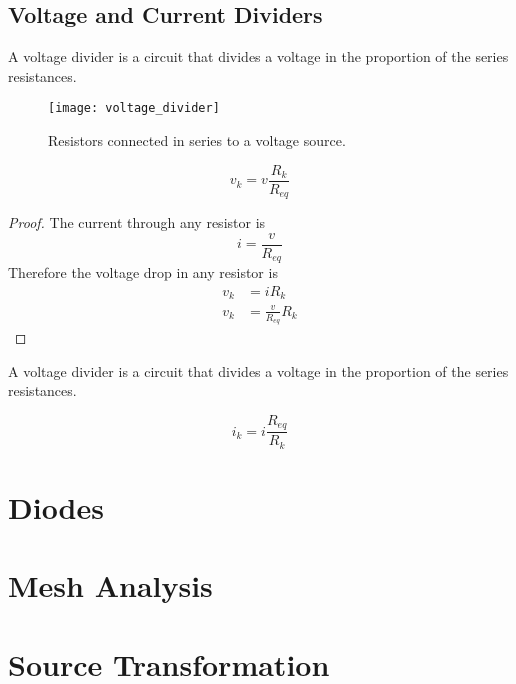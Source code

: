 \documentclass{article}
\begin{document}
\subsection{Voltage and Current Dividers}
\begin{definition}
    A voltage divider is a circuit that divides a voltage in the proportion of the series resistances.
\end{definition}
\begin{figure}[H]
    \centering
    \texttt{[image: voltage\_divider]}
    \caption{Resistors connected in series to a voltage source.}
\end{figure}
\begin{theorem}
    \begin{equation*}
        v_k = v \frac{R_k}{R_{eq}}
    \end{equation*}
\end{theorem}
\begin{proof}
    The current through any resistor is
    \begin{equation*}
        i = \frac{v}{R_{eq}}
    \end{equation*}
    Therefore the voltage drop in any resistor is
    \begin{align*}
        v_k &= i R_k \\
        v_k &= \frac{v}{R_{eq}} R_k
    \end{align*}
\end{proof}
\begin{definition}
    A voltage divider is a circuit that divides a voltage in the proportion of the series resistances.
\end{definition}
\begin{theorem}
    \begin{equation*}
        i_k = i \frac{R_{eq}}{R_k}
    \end{equation*}
\end{theorem}
\newpage 
\section{Diodes}
\newpage
\section{Mesh Analysis}
\newpage
\section{Source Transformation}
\newpage
\end{document}
